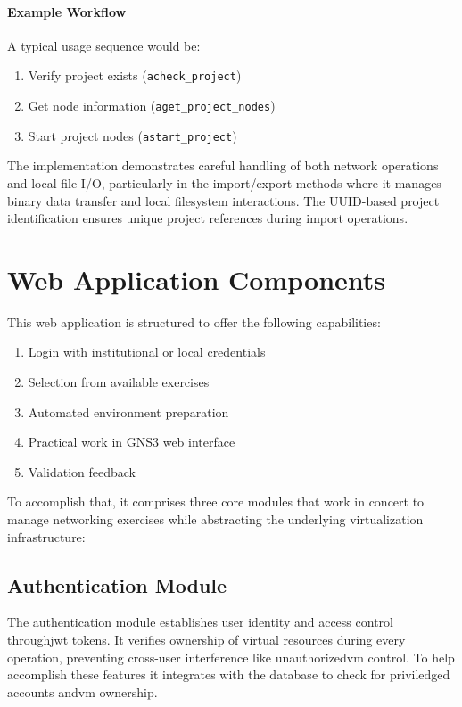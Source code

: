         \paragraph{Example Workflow}

        A typical usage sequence would be:

        \begin{enumerate}
            \item Verify project exists (\texttt{acheck\_project})
            \item Get node information (\texttt{aget\_project\_nodes})
            \item Start project nodes (\texttt{astart\_project})
        \end{enumerate}

        The implementation demonstrates careful handling of both network operations and local file I/O, 
        particularly in the import/export methods where it manages binary data transfer and local filesystem 
        interactions. The UUID-based project identification ensures unique project references during import 
        operations.

\section{Web Application Components}
    This web application is structured to offer the following capabilities:
        \begin{enumerate}
            \item Login with institutional or local credentials
            \item Selection from available exercises
            \item Automated environment preparation
            \item Practical work in GNS3 web interface
            \item Validation feedback
        \end{enumerate}

    To accomplish that, it comprises three core modules that work in concert to manage networking exercises while 
    abstracting the underlying virtualization infrastructure:

    \subsection{Authentication Module}
        The authentication module establishes user identity and access control through\ac{jwt} tokens. It 
        verifies ownership of virtual resources during every operation, preventing cross-user interference 
        like unauthorized\ac{vm} control. To help accomplish these features it integrates with the database to 
        check for priviledged accounts and\ac{vm} ownership.

